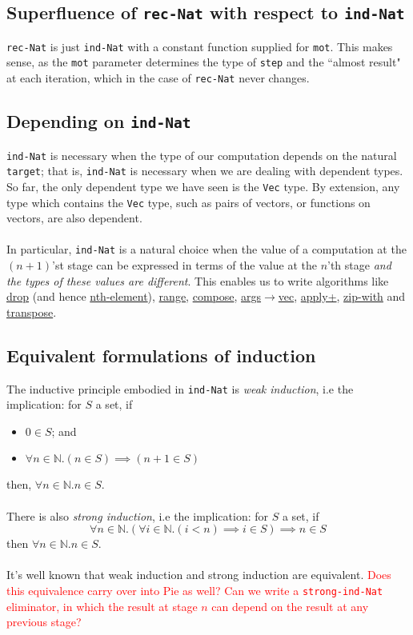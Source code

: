 \documentclass{article}
\newcommand{\ttt}[1]{\texttt{#1}}
\newcommand{\bb}[1]{\mathbb{#1}}
\begin{document}
\subsection{Superfluence of \ttt{rec-Nat} with respect to \ttt{ind-Nat}}
\ttt{rec-Nat} is just \ttt{ind-Nat} with a constant function supplied for \ttt{mot}. This makes sense, as the \ttt{mot} parameter determines the type of \ttt{step} and the ``almost result" at each iteration, which in the case of \ttt{rec-Nat} never changes.
\subsection{Depending on \ttt{ind-Nat}}
\ttt{ind-Nat} is necessary when the type of our computation depends on the natural \ttt{target}; that is, \ttt{ind-Nat} is necessary when we are dealing with dependent types. So far, the only dependent type we have seen is the \ttt{Vec} type. By extension, any type which contains the \ttt{Vec} type, such as pairs of vectors, or functions on vectors, are also dependent.
\\ \\
In particular, \ttt{ind-Nat} is a natural choice when the value of a computation at the \((n + 1)\)'st stage can be expressed in terms of the value at the \(n\)'th stage \textit{and the types of these values are different}. This enables us to write algorithms like \hyperref[code:drop]{drop} (and hence \hyperref[code:nth-element]{nth-element}), \hyperref[code:range]{range}, \hyperref[code:compose]{compose}, \hyperref[code:args-to-vec]{args\(\to\)vec}, \hyperref[code:apply+]{apply+}, \hyperref[code:zip-with]{zip-with} and \hyperref[code:transpose]{transpose}.
\subsection{Equivalent formulations of induction}
The inductive principle embodied in \ttt{ind-Nat} is \textit{weak induction}, i.e the implication: for \(S\) a set, if
\begin{itemize}
    \item \(0 \in S\); and
    \item \(\forall n \in \bb N. (n \in S) \implies (n + 1 \in S)\)
\end{itemize}
then, \(\forall n \in \bb N. n \in S\).
\\ \\
There is also \textit{strong induction}, i.e the implication: for \(S\) a set, if \[
    \forall n \in \bb N. (\forall i \in \bb N. (i < n) \implies i \in S) \implies n \in S
\]
then \(\forall n \in \bb N. n \in S\).
\\ \\
It's well known that weak induction and strong induction are equivalent. \textcolor{red}{Does this equivalence carry over into Pie as well? Can we write a \ttt{strong-ind-Nat} eliminator, in which the result at stage \(n\) can depend on the result at any previous stage?} 
\end{document}

